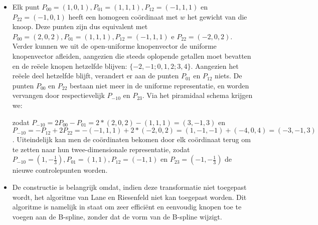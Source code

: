 \documentclass{report}
\begin{document}
\begin{enumerate}
	{
		\begin{itemize} 	
			\item Elk punt $P_{00} = (1, 0, 1), P_{01} = (1, 1, 1), P_{12} = (-1, 1, 1)$ en $P_{22} = (-1, 0, 1)$ heeft een homogeen coördinaat met $w$ het gewicht van die knoop. Deze punten zijn dus equivalent met $P_{00} = (2, 0, 2), P_{01} = (1, 1, 1), P_{12} = (-1, 1, 1)$ e $P_{22} = (-2, 0 , 2)$. Verder kunnen we uit de open-uniforme knopenvector de uniforme knopenvector afleiden, aangezien die steeds oplopende getallen moet bevatten en de reëele knopen hetzelfde blijven: $\{-2, -1; 0, 1, 2; 3, 4\}$. Aangezien het reëele deel hetzelfde blijft, verandert er aan de punten $P_{01}$ en $P_{12}$ niets. De punten $P_{00}$ en $P_{22}$ bestaan niet meer in de uniforme representatie, en worden vervangen door respectievelijk $P_{-10}$ en $P_{23}$. Via het piramidaal schema krijgen we:
			\begin{figure}[ht]
				\centering
			\end{figure}

			zodat $P_{-10} = 2P_{00} - P_{01} = 2 * (2, 0, 2) - (1, 1, 1) = (3, -1, 3)$ en $P_{-10} = -P_{12} + 2P_{22} = -(-1, 1, 1) + 2 * (-2, 0, 2) = (1, -1, -1) + (-4, 0, 4) = (-3, -1, 3)$. Uiteindelijk kan men de coördinaten bekomen door elk coördinaat terug om te zetten naar hun twee-dimensionale representatie, zodat $P_{-10} = (1, -\frac{1}{3}), P_{01} = (1, 1), P_{12} = (-1, 1)$ en $P_{23} = (-1, -\frac{1}{3})$ de nieuwe controlepunten worden.

			\item De constructie is belangrijk omdat, indien deze transformatie niet toegepast wordt, het algoritme van Lane en Riesenfeld niet kan toegepast worden. Dit algoritme is namelijk in staat om zeer efficiënt en eenvoudig knopen toe te voegen aan de B-spline, zonder dat de vorm van de B-spline wijzigt. 
		\end{itemize}
	}
\end{enumerate}
\end{document}
